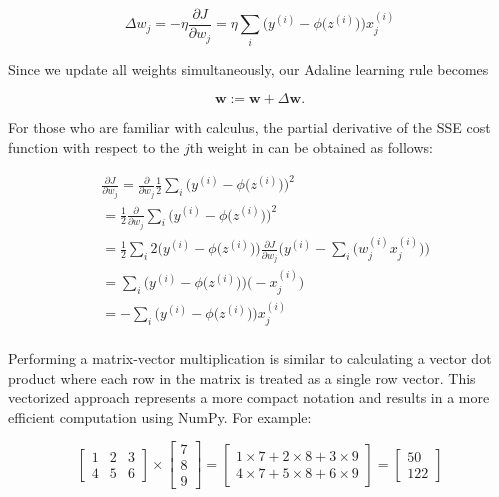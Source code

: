 \documentclass{report}
\begin{document}
\[
\Delta w_j = - \eta \frac{\partial J}{\partial w_j} = \eta  \sum_i \bigg( y^{(i)} - \phi \big(z^{(i)} \big) \bigg) x_{j}^{(i)}
\]

Since we update all weights simultaneously, our Adaline learning rule becomes

\[
\mathbf{w} := \mathbf{w} + \Delta \mathbf{w}.
\]


For those who are familiar with calculus, the partial derivative of the SSE cost function with respect to the $j$th weight in can be obtained as follows:

\begin{equation} 
\begin{split}
& \frac{\partial J}{\partial w_j} = \frac{\partial}{\partial w_j} \frac{1}{2} \sum_i \bigg(  y^{(i)} - \phi \big( z^{(i)} \big)  \bigg)^2 \\
& = \frac{1}{2} \frac{\partial}{\partial w_j} \sum_i \bigg(  y^{(i)} - \phi \big( z^{(i)} \big)  \bigg)^2 \\
& = \frac{1}{2} \sum_i 2 \bigg(  y^{(i)} - \phi \big( z^{(i)} \big)  \bigg) \frac{\partial J}{\partial w_j} \Bigg( y^{(i)} - \sum_i \bigg( w_{j}^{(i)} x_{j}^{(i)} \bigg)\Bigg) \\
& = \sum_i \bigg(  y^{(i)} - \phi \big( z^{(i)} \big)  \bigg) \bigg( - x_{j}^{(i)} \bigg) \\
& = - \sum_i \bigg(  y^{(i)} - \phi \big( z^{(i)} \big)  \bigg) x_{j}^{(i)}  \\
\end{split}
\end{equation}

Performing a matrix-vector multiplication is similar to calculating a vector dot product where each row in the matrix is treated as a single row vector. This vectorized approach represents a more compact notation and results in a more efficient computation using NumPy. For example:

\[
 \begin{bmatrix}
    1 & 2  & 3\\
    4 & 5  & 6
\end{bmatrix} \times  \begin{bmatrix}
    7 \\
    8 \\
    9
\end{bmatrix} =  \begin{bmatrix}
    1 \times 7 + 2 \times 8 + 3 \times 9 \\
    4 \times 7 + 5 \times 8 + 6 \times 9
\end{bmatrix} = \begin{bmatrix}
    50 \\
    122
\end{bmatrix}
\]
\end{document}
